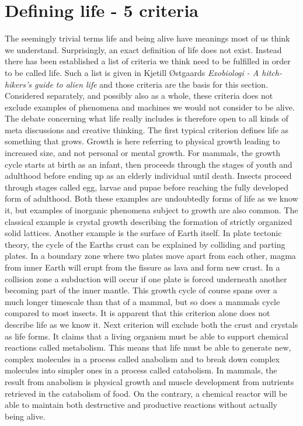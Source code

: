\section{Defining life - 5 criteria}

The seemingly trivial terms life and being alive have meanings most of us think we understand. Surprisingly, an exact definition of life does not exist. Instead there has been established a list of criteria we think need to be fulfilled in order to be called life. Such a list is given in Kjetill \O stgaards \textit{Exobiologi - A hitch-hikers's guide to alien life} \cite{Exoboken} and those criteria are the basis for this section. Considered separately, and possibly also as a whole, these criteria does not exclude examples of phenomena and machines we would not consider to be alive. The debate concerning what life really includes is therefore open to all kinds of meta
discussions and creative thinking.
The first typical criterion defines life as something that grows. Growth is here referring to physical growth leading to increased size, and not personal or mental growth. For mammals, the growth cycle starts at birth as an infant, then proceeds through the stages of youth and adulthood before ending up as an elderly individual until death. Insects proceed through stages called egg, larvae and pupae before reaching the fully developed form of adulthood. Both these examples are undoubtedly forms of life as we know it, but examples of inorganic phenomena subject to growth are also common. The classical example is crystal growth describing the formation of strictly organized solid lattices. Another example is the surface of Earth itself. In plate tectonic theory, the cycle of the Earths crust can be explained by colliding and parting plates. In a boundary zone where two plates move apart from each other, magma from inner Earth will erupt from the fissure as lava and form new crust. In a collision zone a subduction will occur if one plate is forced underneath another becoming part of the inner mantle. This growth cycle of course spans over a much longer timescale than that of a mammal, but so does a mammals cycle compared to most insects. It is apparent that this criterion alone does not describe life as we know it.
Next criterion will exclude both the crust and crystals as life forms. It claims that a living organism must be able to support chemical reactions called metabolism. This means that life must be able to generate new, complex molecules in a process called anabolism and to break down complex molecules into simpler ones in a process called catabolism. In mammals, the result from anabolism is physical growth and muscle development from nutrients retrieved in the catabolism of food. On the contrary, a chemical reactor will be able to maintain both destructive and productive reactions without actually being alive.
